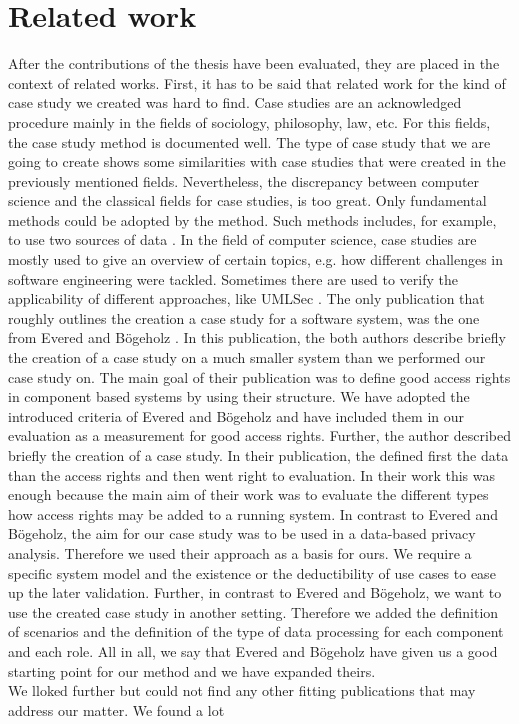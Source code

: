 
\chapter{Related work}
\label{ch:relWork}
After the contributions of the thesis have been evaluated, they are placed in the context of related works. First, it has to be said that related work for the kind of case study we created was hard to find. Case studies are an acknowledged procedure mainly in the fields of sociology, philosophy, law, etc. For this fields, the case study method is documented well. The type of case study that we are going to create shows some similarities with case studies that were created in the previously mentioned fields. Nevertheless, the discrepancy between computer science and the classical fields for case studies, is too great. Only fundamental methods could be adopted by the method. Such methods includes, for example, to use two sources of data \cite{cs2sources}. In the field of computer science, case studies are mostly used to give an overview of certain topics, e.g. how different challenges in software engineering were tackled. Sometimes there are used to verify the applicability of different approaches, like UMLSec \cite{UMLSecCS}. The only publication that roughly outlines the creation a case study for a software system, was the one from Evered and Bögeholz \cite{CaseStudyAndAccessrigths}. In this publication, the both authors describe briefly the creation of a case study on a much smaller system than we performed our case study on. The main goal of their publication was to define good access rights in component based systems by using their structure. We have adopted the introduced criteria of Evered and Bögeholz \cite{CaseStudyAndAccessrigths} and have included them in our evaluation as a measurement for good access rights. Further, the author described briefly the creation of a case study. In their publication, the defined first the data than the access rights and then went right to evaluation. In their work this was enough because the main aim of their work was to evaluate the different types how access rights may be added to a running system. In contrast to Evered and Bögeholz, the aim for our case study was to be used in a data-based privacy analysis. Therefore we used their approach as a basis for ours. We require a specific system model and the existence or the deductibility of use cases to ease up the later validation. Further, in contrast to Evered and Bögeholz, we want to use the created case study in another setting. Therefore we added the definition of scenarios and the definition of the type of data processing for each component and each role. All in all, we say that Evered and Bögeholz have given us a good starting point for our method and we have expanded theirs.\\ We lloked further but could not find any other fitting publications that may address our matter. We found a lot 